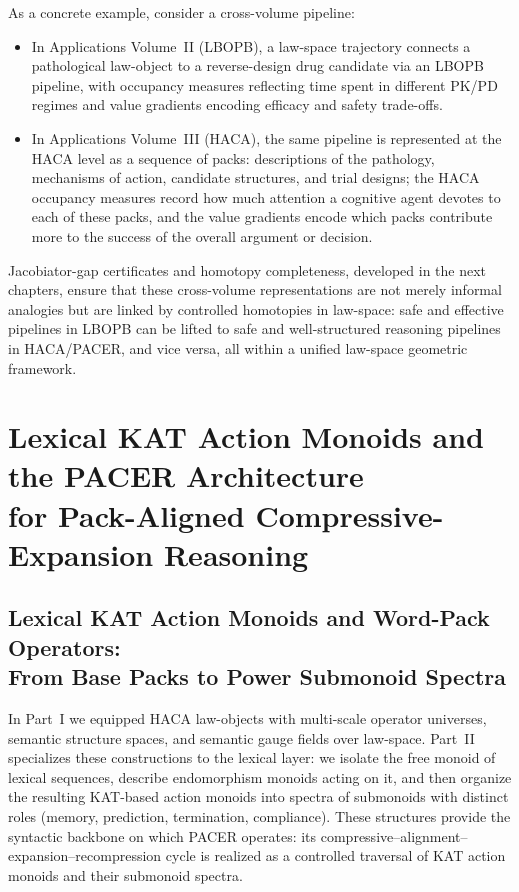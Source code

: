 \documentclass[11pt]{book}
\theoremstyle{plain}
\theoremstyle{definition}
\theoremstyle{remark}
\begin{document}
As a concrete example, consider a cross-volume pipeline:
\begin{itemize}
  \item In Applications Volume~II (LBOPB), a law-space trajectory
        connects a pathological law-object to a reverse-design drug
        candidate via an LBOPB pipeline, with occupancy measures
        reflecting time spent in different PK/PD regimes and value
        gradients encoding efficacy and safety trade-offs.
  \item In Applications Volume~III (HACA), the same pipeline is
        represented at the HACA level as a sequence of packs:
        descriptions of the pathology, mechanisms of action, candidate
        structures, and trial designs; the HACA occupancy measures
        record how much attention a cognitive agent devotes to each of
        these packs, and the value gradients encode which packs
        contribute more to the success of the overall argument or
        decision.
\end{itemize}
Jacobiator-gap certificates and homotopy completeness, developed in the
next chapters, ensure that these cross-volume representations are not
merely informal analogies but are linked by controlled homotopies in
law-space: safe and effective pipelines in LBOPB can be lifted to safe
and well-structured reasoning pipelines in HACA/PACER, and vice versa,
all within a unified law-space geometric framework.



\part[Lexical KAT Action Monoids and the PACER Architecture]{Lexical KAT Action Monoids and the PACER Architecture\\
      for Pack-Aligned Compressive-Expansion Reasoning}

\chapter[Lexical KAT Action Monoids and Word-Pack Operators]{Lexical KAT Action Monoids and Word-Pack Operators:\\
         From Base Packs to Power Submonoid Spectra}
In Part~I we equipped HACA law-objects with multi-scale operator
universes, semantic structure spaces, and semantic gauge fields over
law-space. Part~II specializes these constructions to the lexical layer:
we isolate the free monoid of lexical sequences, describe endomorphism
monoids acting on it, and then organize the resulting KAT-based action
monoids into spectra of submonoids with distinct roles (memory,
prediction, termination, compliance). These structures provide the
syntactic backbone on which PACER operates: its compressive–alignment–
expansion–recompression cycle is realized as a controlled traversal of
KAT action monoids and their submonoid spectra.
\end{document}
